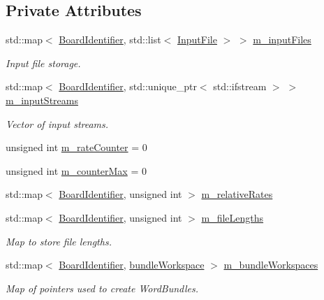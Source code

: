 \subsection*{Private Attributes}
\begin{DoxyCompactItemize}
\item 
std\+::map$<$ \hyperlink{class_board_identifier}{Board\+Identifier}, std\+::list$<$ \hyperlink{class_input_file}{Input\+File} $>$ $>$ \hyperlink{class_file_reader_a1b30d4ef75ca8de90c7271bc39ae320b}{m\+\_\+input\+Files}
\begin{DoxyCompactList}\small\item\em Input file storage. \end{DoxyCompactList}\item 
std\+::map$<$ \hyperlink{class_board_identifier}{Board\+Identifier}, std\+::unique\+\_\+ptr$<$ std\+::ifstream $>$ $>$ \hyperlink{class_file_reader_ad24e41220e68e1857fdef7df35c1d2da}{m\+\_\+input\+Streams}
\begin{DoxyCompactList}\small\item\em Vector of input streams. \end{DoxyCompactList}\item 
unsigned int \hyperlink{class_file_reader_a2e6b51dae972af878f7751f2b6a54d75}{m\+\_\+rate\+Counter} = 0
\item 
unsigned int \hyperlink{class_file_reader_a7e3ce1501c6bd018d818aab3bfa18cdb}{m\+\_\+counter\+Max} = 0
\item 
std\+::map$<$ \hyperlink{class_board_identifier}{Board\+Identifier}, unsigned int $>$ \hyperlink{class_file_reader_ab00c6ff706d8cee9ee064f9cc3258d08}{m\+\_\+relative\+Rates}
\item 
std\+::map$<$ \hyperlink{class_board_identifier}{Board\+Identifier}, unsigned int $>$ \hyperlink{class_file_reader_a983147c8929ee236bfde512c98e7e90d}{m\+\_\+file\+Lengths}
\begin{DoxyCompactList}\small\item\em Map to store file lengths. \end{DoxyCompactList}\item 
std\+::map$<$ \hyperlink{class_board_identifier}{Board\+Identifier}, \hyperlink{class_file_reader_a7fb625dc45cee3256d37cc19c65cad86}{bundle\+Workspace} $>$ \hyperlink{class_file_reader_ac9ec812e6d9fbd7014cf0b4fc69557f9}{m\+\_\+bundle\+Workspaces}
\begin{DoxyCompactList}\small\item\em Map of pointers used to create Word\+Bundles. \end{DoxyCompactList}\item 

\end{DoxyCompactItemize}
